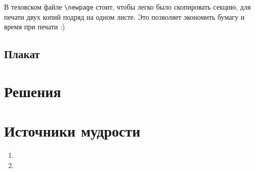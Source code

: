 \documentclass[12pt]{article}
\newcounter{problem}[section]
\theoremstyle{definition}
\begin{document}
В теховском файле \verb|\newpage| стоит, чтобы легко было скопировать секцию, для печати двух копий подряд на одном листе.
Это позволяет экономить бумагу и время при печати :)

\subsection{Плакат}






\renewenvironment{solution}[1]{%
         \vskip .5cm plus 2cm minus 0.1cm%
         {\bfseries \hyperlink{problem:#1}{#1.}}%
}%
{%
}%



\section{Решения}



\section{Источники мудрости}


\begin{enumerate}
\item 
\item 
\end{enumerate}

\printbibliography[heading=none]
\end{document}
